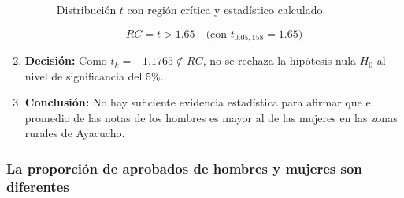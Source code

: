 \documentclass[
]{article}
\begin{document}
\begin{enumerate}
\begin{figure}[ht]
    \caption{Distribución \( t \) con región crítica y estadístico calculado.}
   \end{figure}
   \[
    RC = t > 1.65 \quad \text{(con } t_{0.05, 158} = 1.65\text{)}
    \]

  \item \textbf{Decisión:}
    Como \(t_k = -1.1765 \notin RC\), no se rechaza la hipótesis nula \(H_0\) al nivel de significancia del 5\%.

  \item \textbf{Conclusión:}
    No hay suficiente evidencia estadística para afirmar que el promedio de las notas de los hombres es mayor al de las mujeres en las zonas rurales de Ayacucho.
\end{enumerate}

\subsubsection*{La proporción de aprobados de hombres y mujeres son
diferentes}\label{la-proporciuxf3n-de-aprobados-de-hombres-y-mujeres-son-diferentes}
\end{document}
